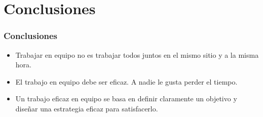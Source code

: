 \documentclass[a4paper,slidestop,xcolor=pst,dvips,blue]{beamer}
\begin{document}
\section{Conclusiones}

\begin{frame}[c]
	\frametitle{Conclusiones}
	\begin{itemize}[<+->]
		\item Trabajar en equipo no es trabajar todos juntos en el mismo sitio y a la misma hora.
		\item El trabajo en equipo debe ser eficaz. A nadie le gusta perder el tiempo.
		\item Un trabajo eficaz en equipo se basa en definir claramente un objetivo y diseñar una estrategia eficaz para satisfacerlo.
	\end{itemize}
\end{frame}
\end{document}
